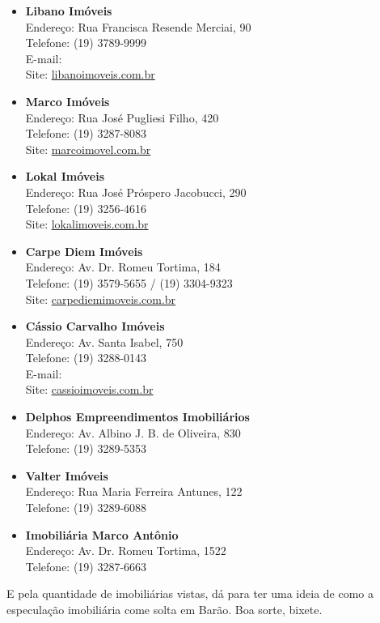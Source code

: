 \begin{itemize}
\item \textbf{Libano Imóveis}
  \\Endereço: Rua Francisca Resende Merciai, 90
  \\Telefone: (19) 3789-9999
  \\E-mail: 
  \\Site: \url{libanoimoveis.com.br}

\item \textbf{Marco Imóveis}
  \\Endereço: Rua José Pugliesi Filho, 420
  \\Telefone: (19) 3287-8083
  \\Site: \url{marcoimovel.com.br}

\item \textbf{Lokal Imóveis}
  \\Endereço: Rua José Próspero Jacobucci, 290
  \\Telefone: (19) 3256-4616
  \\Site: \url{lokalimoveis.com.br}

\item \textbf{Carpe Diem Imóveis}
  \\Endereço: Av. Dr. Romeu Tortima, 184
  \\Telefone: (19) 3579-5655 / (19) 3304-9323
  \\Site: \url{carpediemimoveis.com.br}

\item \textbf{Cássio Carvalho Imóveis}
  \\Endereço: Av. Santa Isabel, 750
  \\Telefone: (19) 3288-0143
  \\E-mail: 
  \\Site: \url{cassioimoveis.com.br}

\item \textbf{Delphos Empreendimentos Imobiliários}
  \\Endereço: Av. Albino J. B. de Oliveira, 830
  \\Telefone: (19) 3289-5353

\item \textbf{Valter Imóveis}
  \\Endereço: Rua Maria Ferreira Antunes, 122
  \\Telefone: (19) 3289-6088

\item \textbf{Imobiliária Marco Antônio}
  \\Endereço: Av. Dr. Romeu Tortima, 1522
  \\Telefone: (19) 3287-6663
\end{itemize}

E pela quantidade de imobiliárias vistas, dá para ter uma ideia de como a
especulação imobiliária come solta em Barão. Boa sorte, bixete.
